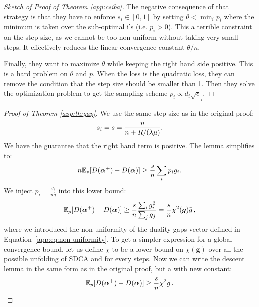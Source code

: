 \begin{subappendices}
\begin{proof}[Sketch of Proof of Theorem \ref{app:csiba}]
		The negative consequence of that strategy is that they have to enforce $s_i \in [0,1]$ by setting
		$\theta < \min_i p_i$ where the minimum is taken over the sub-optimal i's (i.e. $p_i>0$).
		This a terrible constraint on the step size, as we cannot be too non-uniform without taking very small steps.
		It effectively reduces the linear convergence constant $\theta /n$.
		
		Finally, they want to maximize $\theta$ while keeping the right hand side positive.
		This is a hard problem on $\theta$ and $p$.
		When the loss is the quadratic loss, they can remove the condition that the step size should be smaller than 1.
		Then they solve the optimization problem to get the sampling scheme $p_i \propto d_i \sqrt c_i$.
	\end{proof}
	
	\begin{proof}[Proof of Theorem \ref{app:th:gap}]
		We use the same step size as in the original proof:
		\begin{equation}
			s_i = s = \frac{n}{n+R/(\lambda \mu)}.
		\end{equation}
		We have the guarantee that the right hand term is positive. The lemma simplifies to:
		\begin{equation}
			n \mathbb E_p[D(\boldsymbol{\alpha}^+) - D(\boldsymbol{\alpha})]
			\geq \frac{s}{n} \sum_i p_i g_i.
		\end{equation}
		We inject $p_i= \frac{g_i}{n\bar g}$ into this lower bound:
		\begin{equation}
			\mathbb E_p[D(\boldsymbol{\alpha}^+) - D(\boldsymbol{\alpha})]
			\geq \frac{s}{n} \frac{\sum_i g_i^2}{\sum_j g_j}
			= \frac{s}{n} \chi^2(\bm g) \bar g\, ,
		\end{equation}
		where we introduced the non-uniformity of the duality gaps vector defined in Equation~\eqref{app:eq:non-uniformity}.
		To get a simpler expression for a global convergence bound, let us define $\chi$ to be a lower bound on $\chi(\bm g)$ over all the possible unfolding of SDCA and for every steps.
		Now we can write the descent lemma in the same form as in the original proof, but a with new constant:
		\begin{equation}
			\mathbb E_p[D(\boldsymbol{\alpha}^+) - D(\boldsymbol{\alpha})]
			\geq \frac{s}{n} \chi^2 \bar g\, .
		\end{equation}
	\end{proof}
	

\end{subappendices}
